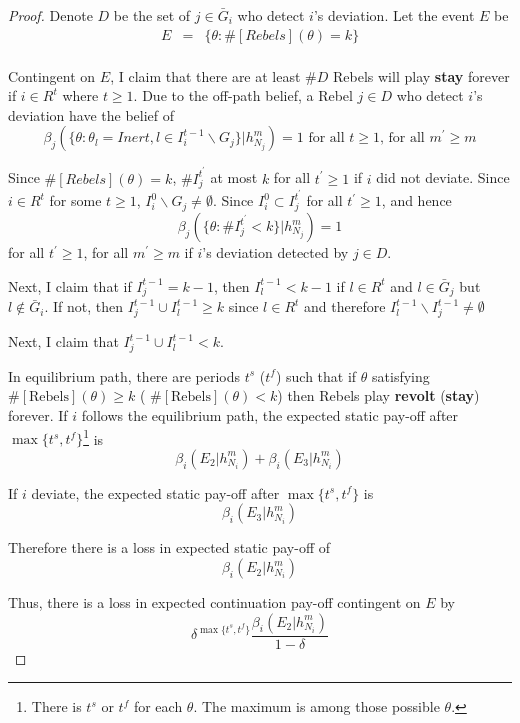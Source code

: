 \documentclass[12pt]{article}
\theoremstyle{remark}
\theoremstyle{remark}
\begin{document}
\begin{proof}

Denote $D$ be the set of $j\in \bar{G}_i$ who detect $i$'s deviation. Let the event $E$ be
\begin{eqnarray*}
E 	&= &\{\theta: \#[Rebels](\theta)=k\}\\
\end{eqnarray*}

Contingent on $E$, I claim that there are at least $\#D$ Rebels will play \textbf{stay} forever if $i\in R^{t}$ where $t\geq 1$. Due to the off-path belief, a Rebel $j\in D$ who detect $i$'s deviation have the belief of
\[\beta_{j}(\{\theta:\theta_l=Inert,l\in I^{t-1}_i\backslash G_j\}|h^{m}_{N_j})=1 \text{ for all $t\geq 1$, for all $m^{'}\geq m$}\] 

Since $\#[Rebels](\theta)=k$, $\# I^{t^{'}}_j$ at most $k$ for all $t^{'}\geq 1$ if $i$ did not deviate. Since $i\in R^t$ for some $t\geq 1$, $ I^0_i\backslash G_j \neq \emptyset$. Since $I^0_i\subset I^{t^{'}}_j$ for all $t^{'}\geq 1$, and hence 
\[\beta_{j}(\{\theta:\# I^{t^{'}}_j<k\}|h^{m}_{N_j})=1\] 
for all $t^{'}\geq 1$, for all $m^{'}\geq m$ if $i$'s deviation detected by $j\in D$. 

Next, I claim that if $I^{t-1}_j=k-1$, then $I^{t-1}_{l}<k-1$ if $l\in R^t$ and $l\in \bar{G}_j$ but $l\notin \bar{G}_i$. If not, then $I^{t-1}_j\cup I^{t-1}_{l}\geq k$ since $l\in R^t$ and therefore $I^{t-1}_l\backslash I^{t-1}_j\neq \emptyset$

Next, I claim that $I^{t-1}_j\cup I^{t-1}_{l}< k$.

In equilibrium path, there are periods $t^{s}$ ($t^{f}$) such that if $\theta$ satisfying $\#[\text{Rebels}](\theta)\geq k$ ( $\#[\text{Rebels}](\theta)< k$) then Rebels play \textbf{revolt} (\textbf{stay}) forever. If $i$ follows the equilibrium path, the expected static pay-off after $\max\{t^s,t^f\}$\footnote{There is $t^{s}$ or $t^{f}$ for each $\theta$. The maximum is among those possible $\theta$.} is
 \[\beta_{i}(E_2|h^{m}_{N_i})+\beta_{i}(E_3|h^{m}_{N_i})\]

If $i$ deviate, the expected static pay-off after $\max\{t^s,t^f\}$ is
 \[\beta_{i}(E_3|h^{m}_{N_i})\]
 
Therefore there is a loss in expected static pay-off of
\[\beta_{i}(E_2|h^{m}_{N_i})\]

Thus, there is a loss in expected continuation pay-off contingent on $E$ by
\[\delta^{\max\{t^s,t^f\}}\frac{\beta_{i}(E_2|h^{m}_{N_i})}{1-\delta}\]

\end{proof}
\end{document}
